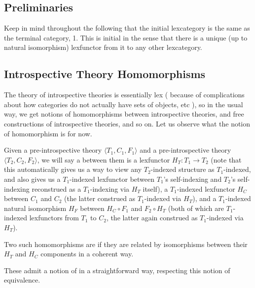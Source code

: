 
\subsection{Preliminaries}
Keep in mind throughout the following that the initial lexcategory is the same as the terminal category, 1. This is initial in the sense that there is a unique (up to natural isomorphism) lexfunctor from it to any other lexcategory.

\subsection{Introspective Theory Homomorphisms}
The theory of introspective theories is essentially lex ( because of complications about how categories do not actually have sets of objects, etc \TODO), so in the usual way, we get notions of homomorphisms between introspective theories, and free constructions of introspective theories, and so on. Let us observe what the notion of homomorphism is for now.

\begin{definition}\label{PreIntrospHomo}
Given a pre-introspective theory $\langle T_1, C_1, F_1 \rangle$ and a pre-introspective theory $\langle T_2, C_2, F_2 \rangle$, we will say a  between them is a lexfunctor $H_T : T_1 \to T_2$ (note that this automatically gives us a way to view any $T_2$-indexed structure as $T_1$-indexed, and also gives us a $T_1$-indexed lexfunctor between $T_1$'s self-indexing and $T_2$'s self-indexing reconstrued as a $T_1$-indexing via $H_T$ itself), a $T_1$-indexed lexfunctor $H_C$ between $C_1$ and $C_2$ (the latter construed as $T_1$-indexed via $H_T$), and a $T_1$-indexed natural isomorphism $H_F$ between $H_C \circ F_1$ and $F_2 \circ H_T$ (both of which are $T_1$-indexed lexfunctors from $T_1$ to $C_2$, the latter again construed as $T_1$-indexed via $H_T$). 

Two such homomorphisms are  if they are related by isomorphisms between their $H_T$ and $H_C$ components in a coherent way. \TODO

These admit a notion of  in a straightforward way, respecting this notion of equivalence. \TODO
\end{definition}


